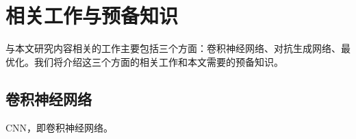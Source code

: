 \chapter{相关工作与预备知识}
\label{cha:related}

  与本文研究内容相关的工作主要包括三个方面：卷积神经网络、对抗生成网络、最优化。我们将介绍这三个方面的相关工作和本文需要的预备知识。

\section{卷积神经网络}
\label{sec:cnn}

  CNN，即卷积神经网络。
